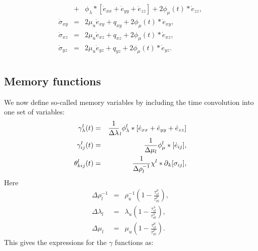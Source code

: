 \documentclass[11pt]{article}
\begin{document}
{\begin{eqnarray}
    & + & \phi_{\lambda}*[\dot{e}_{xx}
                +\dot{e}_{yy}+\dot{e}_{zz}] 
                + 2\phi_{\mu}(t)*\dot{e}_{zz},                 \nonumber\\
  \dot{\sigma}_{xy} 
   & = & 2\mu_u \dot{e}_{xy} +q_{xy} 
                + 2\phi_{\mu}(t)*\dot{e}_{xy},                 \nonumber\\
  \dot{\sigma}_{xz} 
   & = & 2\mu_u \dot{e}_{xz} +q_{xz} 
                + 2\phi_{\mu}(t)*\dot{e}_{xz},                 \nonumber\\
  \dot{\sigma}_{yz} 
   & = & 2\mu_u \dot{e}_{yz} +q_{yz}
               +  2\phi_{\mu}(t)*\dot{e}_{yz}.                 \nonumber\\
\end{eqnarray}
\subsection*{Memory functions} 
We now define so-called memory variables by including the time convolution into one set of variables:
\begin{eqnarray}
 \gamma^l_{\lambda}(t) 
  & =& \frac{1}{\Delta\lambda}_l \phi^l_{\lambda}
       *[\dot{e}_{xx}+\dot{e}_{yy}+\dot{e}_{zz}]\label{eq:gamma-l} \\ 
 \gamma^l_{ij}(t) 
  & =& \frac{1}{\Delta\mu_l}\phi^l_{\mu}
       *[\dot{e}_{ij}],                         \label{eq:gamma-l} \\
 \theta^l_{kij}(t) 
  & =& \frac{1}{\Delta\rho^{-1}_l}\chi^l*\mbox{$\partial$}_k[\sigma_{ij}],  
                                                \label{eq:theta-l}
\end{eqnarray}
Here 
\begin{eqnarray}
  \Delta\rho^{-1}_l 
     & = & \rho^{-1}_u\left(1-\frac{\tau^{\rho}_{\epsilon l}}
                                   {\tau^{\rho}_{\sigma l}}\right),    \\
 \Delta\lambda_l                              
     & = & \lambda_u\left(1-\frac{\tau^{\lambda}_{\epsilon l}}
                              {\tau^{\lambda}_{\sigma l}}\right),      \\
 \Delta\mu_l                              
     & = & \mu_u\left(1-\frac{\tau^{\mu}_{\epsilon l}}
                              {\tau^{\rho}_{\sigma l}}\right).         
\end{eqnarray}
This gives the expressions for the $\gamma$ functions as:
}
\end{document}
